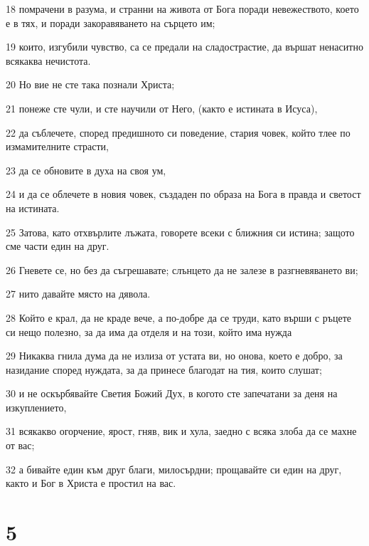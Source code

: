 \par 18 помрачени в разума, и странни на живота от Бога поради невежеството, което е в тях, и поради закоравяването на сърцето им;
\par 19 които, изгубили чувство, са се предали на сладострастие, да вършат ненаситно всякаква нечистота.
\par 20 Но вие не сте така познали Христа;
\par 21 понеже сте чули, и сте научили от Него, (както е истината в Исуса),
\par 22 да съблечете, според предишното си поведение, стария човек, който тлее по измамителните страсти,
\par 23 да се обновите в духа на своя ум,
\par 24 и да се облечете в новия човек, създаден по образа на Бога в правда и светост на истината.
\par 25 Затова, като отхвърлите лъжата, говорете всеки с ближния си истина; защото сме части един на друг.
\par 26 Гневете се, но без да съгрешавате; слънцето да не залезе в разгневяването ви;
\par 27 нито давайте място на дявола.
\par 28 Който е крал, да не краде вече, а по-добре да се труди, като върши с ръцете си нещо полезно, за да има да отделя и на този, който има нужда
\par 29 Никаква гнила дума да не излиза от устата ви, но онова, което е добро, за назидание според нуждата, за да принесе благодат на тия, които слушат;
\par 30 и не оскърбявайте Светия Божий Дух, в когото сте запечатани за деня на изкуплението,
\par 31 всякакво огорчение, ярост, гняв, вик и хула, заедно с всяка злоба да се махне от вас;
\par 32 а бивайте един към друг благи, милосърдни; прощавайте си един на друг, както и Бог в Христа е простил на вас.

\chapter{5}

